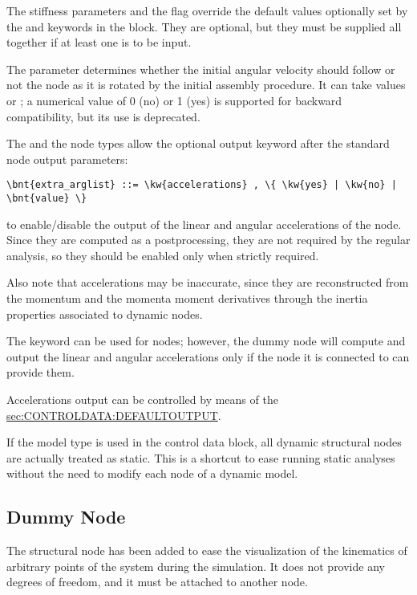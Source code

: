 The stiffness parameters and the  flag
override the default values optionally set by the 
and  keywords in the  block. 
They are optional, but they must be supplied all together if at least
one is to be input.

The  parameter determines whether 
the initial angular velocity should follow or not the node 
as it is rotated by the initial assembly procedure.
It can take values  or ;
a numerical value of 0 (no) or 1 (yes) is supported for backward
compatibility, but its use is deprecated.

The  and the  node types allow
the optional output keyword
 after the standard node output parameters:
\begin{Verbatim}[commandchars=\\\{\}]
    \bnt{extra_arglist} ::= \kw{accelerations} , \{ \kw{yes} | \kw{no} | \bnt{value} \}
\end{Verbatim}
to enable/disable the output of the linear and angular accelerations
of the node.  Since they are computed as a postprocessing, they are not required
by the regular analysis, so they should be enabled only when strictly required.

Also note that accelerations may be inaccurate, since they are reconstructed
from the momentum and the momenta moment derivatives through the inertia
properties associated to dynamic nodes.

The keyword  can be used for  nodes;
however, the dummy node will compute and output the linear and angular accelerations
only if the node it is connected to can provide them.

Accelerations output can be controlled by means of the
\hyperref{\kw{default output} statement}{\kw{default output} statement (see Section~}{)}{sec:CONTROLDATA:DEFAULTOUTPUT}.

If the  model type is used in the control data block,
all dynamic structural nodes are actually treated as static.
This is a shortcut to ease running static analyses without the need
to modify each node of a dynamic model.

\subsection{Dummy Node}
\label{sec:NODE:STRUCTURAL:DUMMY}
The  structural node has been added to ease the visualization
of the kinematics of arbitrary points of the system
during the simulation. 
It does not provide any degrees of freedom, and it must be attached
to another node.

